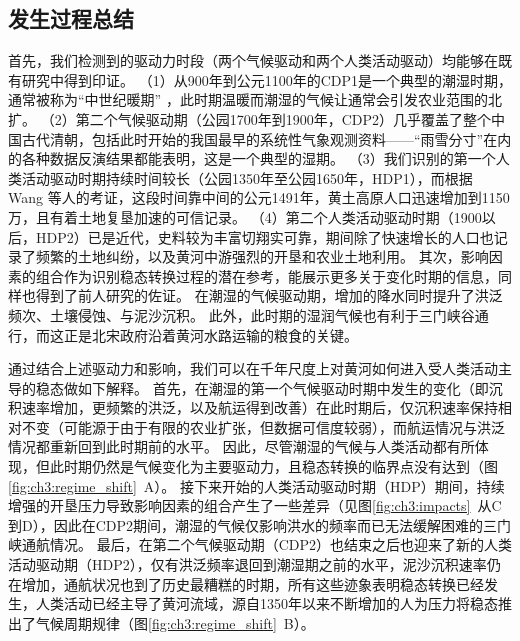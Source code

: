 \subsection{发生过程总结}
首先，我们检测到的驱动力时段（两个气候驱动和两个人类活动驱动）均能够在既有研究中得到印证。
（1）从900年到公元1100年的CDP1是一个典型的潮湿时期，通常被称为“中世纪暖期” \cite{zhang1993, zhang1994, man2014}，此时期温暖而潮湿的气候让通常会引发农业范围的北扩\cite{TanQiXiang1996,GeQuanSheng2011}。
（2）第二个气候驱动期（公园1700年到1900年，CDP2）几乎覆盖了整个中国古代清朝，包括此时开始的我国最早的系统性气象观测资料——“雨雪分寸”在内的各种数据反演结果都能表明，这是一个典型的湿期\cite{hao2021, ge2008}。
（3）我们识别的第一个人类活动驱动时期持续时间较长（公园1350年至公园1650年，HDP1），而根据 Wang 等人的考证，这段时间靠中间的公元1491年，黄土高原人口迅速增加到1150万，且有着土地复垦加速的可信记录\cite{wang2006b}。
（4）第二个人类活动驱动时期（1900以后，HDP2）已是近代，史料较为丰富切翔实可靠，期间除了快速增长的人口也记录了频繁的土地纠纷，以及黄河中游强烈的开垦和农业土地利用\cite{GeJianXiong2005}。
其次，影响因素的组合作为识别稳态转换过程的潜在参考，能展示更多关于变化时期的信息，同样也得到了前人研究的佐证。
在潮湿的气候驱动期，增加的降水同时提升了洪泛频次、土壤侵蚀、与泥沙沉积\cite{chen2012}。
此外，此时期的湿润气候也有利于三门峡谷通行，而这正是北宋政府沿着黄河水路运输的粮食的关键\cite{WangShouChun1993}。

通过结合上述驱动力和影响，我们可以在千年尺度上对黄河如何进入受人类活动主导的稳态做如下解释。
首先，在潮湿的第一个气候驱动时期中发生的变化（即沉积速率增加，更频繁的洪泛，以及航运得到改善）在此时期后，仅沉积速率保持相对不变（可能源于由于有限的农业扩张，但数据可信度较弱），而航运情况与洪泛情况都重新回到此时期前的水平。
因此，尽管潮湿的气候与人类活动都有所体现，但此时期仍然是气候变化为主要驱动力，且稳态转换的临界点没有达到（图\ref{fig:ch3:regime_shift}~A）。
接下来开始的人类活动驱动时期（HDP）期间，持续增强的开垦压力导致影响因素的组合产生了一些差异（见图\ref{fig:ch3:impacts}~从C到D），因此在CDP2期间，潮湿的气候仅影响洪水的频率而已无法缓解困难的三门峡通航情况。
最后，在第二个气候驱动期（CDP2）也结束之后也迎来了新的人类活动驱动期（HDP2），仅有洪泛频率退回到潮湿期之前的水平，泥沙沉积速率仍在增加，通航状况也到了历史最糟糕的时期，所有这些迹象表明稳态转换已经发生，人类活动已经主导了黄河流域，源自1350年以来不断增加的人为压力将稳态推出了气候周期规律（图\ref{fig:ch3:regime_shift}~B）。

